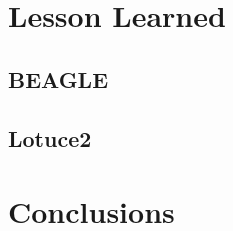 \documentclass[]{spie}  %
\begin{document}
\section{Lesson Learned} \label{sec:LL}
\subsection{BEAGLE}
\subsection{Lotuce2}



\section{Conclusions}

 


\newpage
{}
\end{document}
